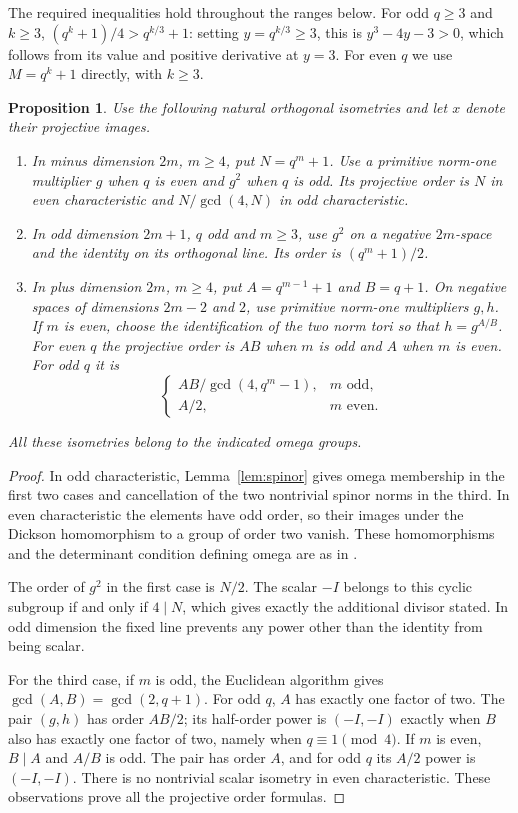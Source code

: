 \documentclass[11pt,a4paper]{article}
\newtheorem{proposition}[lemma]{Proposition}
\begin{document}
The required inequalities hold throughout the ranges below. For odd
$q\ge3$ and $k\ge3$,
$(q^k+1)/4>q^{k/3}+1$: setting $y=q^{k/3}\ge3$, this is
$y^3-4y-3>0$, which follows from its value and positive derivative at
$y=3$. For even $q$ we use $M=q^k+1$ directly, with $k\ge3$.

\begin{proposition}\label{prop:orders}
Use the following natural orthogonal isometries and let $x$ denote their
projective images.
\begin{enumerate}
\item In minus dimension $2m$, $m\ge4$, put $N=q^m+1$. Use a primitive
norm-one multiplier $g$ when $q$ is even and $g^2$ when $q$ is odd.
Its projective order is $N$ in even characteristic and
$N/\gcd(4,N)$ in odd characteristic.
\item In odd dimension $2m+1$, $q$ odd and $m\ge3$, use $g^2$ on a
negative $2m$-space and the identity on its orthogonal line.
Its order is $(q^m+1)/2$.
\item In plus dimension $2m$, $m\ge4$, put
$A=q^{m-1}+1$ and $B=q+1$. On negative spaces of dimensions $2m-2$ and
$2$, use primitive norm-one multipliers $g,h$. If $m$ is even, choose
the identification of the two norm tori so that $h=g^{A/B}$.
For even $q$ the projective order is $AB$ when $m$ is odd and $A$ when
$m$ is even. For odd $q$ it is
\[
 \begin{cases}
 AB/\gcd(4,q^m-1),&m\text{ odd},\\
 A/2,&m\text{ even}.
 \end{cases}
\]
\end{enumerate}
All these isometries belong to the indicated omega groups.
\end{proposition}
\begin{proof}
In odd characteristic, Lemma~\ref{lem:spinor} gives omega membership in
the first two cases and cancellation of the two nontrivial spinor norms
in the third. In even characteristic the elements have odd order, so
their images under the Dickson homomorphism to a group of order two
vanish. These homomorphisms and the determinant condition defining omega
are as in \cite[Section~3]{MRD}.

The order of $g^2$ in the first case is $N/2$. The scalar $-I$ belongs
to this cyclic subgroup if and only if $4\mid N$, which gives exactly
the additional divisor stated. In odd dimension the fixed line prevents
any power other than the identity from being scalar.

For the third case, if $m$ is odd, the Euclidean algorithm gives
$\gcd(A,B)=\gcd(2,q+1)$. For odd $q$, $A$ has exactly one factor of two.
The pair $(g,h)$ has order $AB/2$; its half-order power is $(-I,-I)$
exactly when $B$ also has exactly one factor of two, namely when
$q\equiv1\pmod4$. If $m$ is even, $B\mid A$ and $A/B$ is odd.
The pair has order $A$, and for odd $q$ its $A/2$ power is $(-I,-I)$.
There is no nontrivial scalar isometry in even characteristic. These
observations prove all the projective order formulas.
\end{proof}
\end{document}
